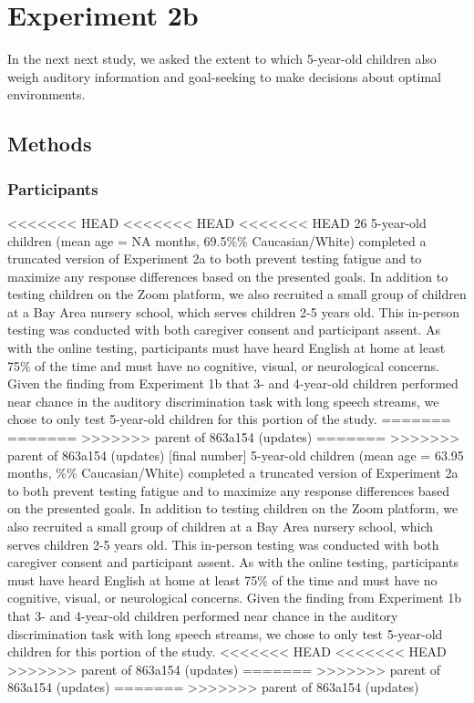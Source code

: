 \documentclass[10pt, letterpaper]{article}
\begin{document}
\hypertarget{experiment-2b}{%
\section{Experiment 2b}\label{experiment-2b}}

In the next next study, we asked the extent to which 5-year-old children
also weigh auditory information and goal-seeking to make decisions about
optimal environments.

\hypertarget{methods-3}{%
\subsection{Methods}\label{methods-3}}

\hypertarget{participants-3}{%
\subsubsection{Participants}\label{participants-3}}

<<<<<<< HEAD
<<<<<<< HEAD
<<<<<<< HEAD
26 5-year-old children (mean age = NA months, 69.5\%\% Caucasian/White)
completed a truncated version of Experiment 2a to both prevent testing
fatigue and to maximize any response differences based on the presented
goals. In addition to testing children on the Zoom platform, we also
recruited a small group of children at a Bay Area nursery school, which
serves children 2-5 years old. This in-person testing was conducted with
both caregiver consent and participant assent. As with the online
testing, participants must have heard English at home at least 75\% of
the time and must have no cognitive, visual, or neurological concerns.
Given the finding from Experiment 1b that 3- and 4-year-old children
performed near chance in the auditory discrimination task with long
speech streams, we chose to only test 5-year-old children for this
portion of the study.
=======
=======
>>>>>>> parent of 863a154 (updates)
=======
>>>>>>> parent of 863a154 (updates)
{[}final number{]} 5-year-old children (mean age = 63.95 months, \%\%
Caucasian/White) completed a truncated version of Experiment 2a to both
prevent testing fatigue and to maximize any response differences based
on the presented goals. In addition to testing children on the Zoom
platform, we also recruited a small group of children at a Bay Area
nursery school, which serves children 2-5 years old. This in-person
testing was conducted with both caregiver consent and participant
assent. As with the online testing, participants must have heard English
at home at least 75\% of the time and must have no cognitive, visual, or
neurological concerns. Given the finding from Experiment 1b that 3- and
4-year-old children performed near chance in the auditory discrimination
task with long speech streams, we chose to only test 5-year-old children
for this portion of the study.
<<<<<<< HEAD
<<<<<<< HEAD
>>>>>>> parent of 863a154 (updates)
=======
>>>>>>> parent of 863a154 (updates)
=======
>>>>>>> parent of 863a154 (updates)
\end{document}
